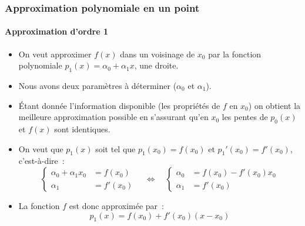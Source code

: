 \documentclass[10pt,notheorems]{beamer}
\theoremstyle{plain}
\theoremstyle{definition} %
\begin{document}
\begin{frame}
  \frametitle{Approximation polynomiale en un point}
  \framesubtitle{Approximation d'ordre 1}
  \hypertarget{slide_taylor_4}{}

  \bigskip

  \begin{itemize}

  \item On veut approximer $f(x)$ dans un voisinage de $x_0$ par la fonction polynomiale $p_1(x) = \alpha_0+\alpha_1 x$, une droite.\newline

  \item Nous avons deux paramètres à déterminer ($\alpha_0$ et $\alpha_1$).\newline

  \item Étant donnée l'information disponible (les propriétés de $f$ en $x_0$) on obtient la meilleure approximation possible en s'assurant qu'en $x_0$ les pentes de $p_0(x)$ et $f(x)$ sont identiques.\newline

  \item On veut que $p_1(x)$ soit tel que $p_1(x_0) = f(x_0)$ et $p_1'(x_0) = f'(x_0)$, c'est-à-dire~:
    \[
      \begin{cases}
        \alpha_0+\alpha_1x_0 &= f(x_0)\\
        \alpha_1 &= f'(x_0)
      \end{cases}
      \quad\Leftrightarrow\quad
      \begin{cases}
        \alpha_0 &= f(x_0)-f'(x_0)x_0\\
        \alpha_1 &= f'(x_0)
      \end{cases}
    \]

    \bigskip

  \item La fonction $f$ est donc approximée par~:
    \[
      p_1(x) = f(x_0) + f'(x_0)(x-x_0)
    \]

  \end{itemize}

\end{frame}
\end{document}
